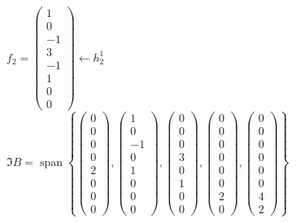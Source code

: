 \documentclass[a4paper, 10pt]{article}
\theoremstyle{theoremdd}
\DeclareMathOperator{\linspan}{span}
\begin{document}
$f_2 = \begin{pmatrix}
1 \\ 0 \\ -1 \\ 3 \\ -1 \\ 1 \\ 0 \\ 0
\end{pmatrix} \longleftarrow h_2^1$
\bigskip \\
$\Im B = \linspan \left\{ \begin{pmatrix} 0 \\ 0 \\ 0 \\ 0 \\ 2 \\ 0 \\ 0 \\ 0 \end{pmatrix}, \begin{pmatrix} 1 \\ 0 \\ -1 \\ 0 \\ 1 \\ 0 \\ 0 \\ 0 \end{pmatrix}, \begin{pmatrix} 0 \\ 0 \\ 0 \\ 3 \\ 0 \\ 1 \\ 0 \\ 0 \end{pmatrix}, \begin{pmatrix} 0 \\ 0 \\ 0 \\ 0 \\ 0 \\ 0 \\ 2 \\ 0 \end{pmatrix}, \begin{pmatrix} 0 \\ 0 \\ 0 \\ 0 \\ 0 \\ 0 \\ 4 \\ 2 \end{pmatrix} \right\}$\\
\end{document}
